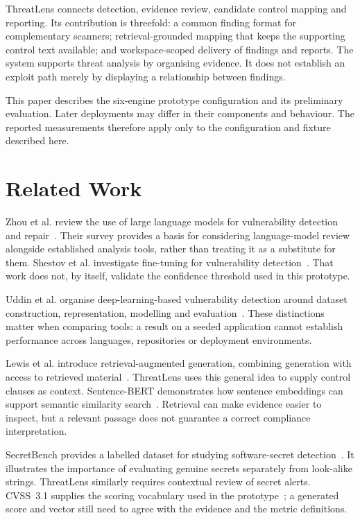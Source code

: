 \documentclass[conference,letterpaper]{IEEEtran}
\begin{document}
ThreatLens connects detection, evidence review, candidate control mapping and reporting. Its contribution is threefold: a common finding format for complementary scanners; retrieval-grounded mapping that keeps the supporting control text available; and workspace-scoped delivery of findings and reports. The system supports threat analysis by organising evidence. It does not establish an exploit path merely by displaying a relationship between findings.

This paper describes the six-engine prototype configuration and its preliminary evaluation. Later deployments may differ in their components and behaviour. The reported measurements therefore apply only to the configuration and fixture described here.

\section{Related Work}
Zhou et al. review the use of large language models for vulnerability detection and repair~\cite{zhou}. Their survey provides a basis for considering language-model review alongside established analysis tools, rather than treating it as a substitute for them. Shestov et al. investigate fine-tuning for vulnerability detection~\cite{shestov}. That work does not, by itself, validate the confidence threshold used in this prototype.

Uddin et al. organise deep-learning-based vulnerability detection around dataset construction, representation, modelling and evaluation~\cite{uddin}. These distinctions matter when comparing tools: a result on a seeded application cannot establish performance across languages, repositories or deployment environments.

Lewis et al. introduce retrieval-augmented generation, combining generation with access to retrieved material~\cite{lewis}. ThreatLens uses this general idea to supply control clauses as context. Sentence-BERT demonstrates how sentence embeddings can support semantic similarity search~\cite{sbert}. Retrieval can make evidence easier to inspect, but a relevant passage does not guarantee a correct compliance interpretation.

SecretBench provides a labelled dataset for studying software-secret detection~\cite{secretbench}. It illustrates the importance of evaluating genuine secrets separately from look-alike strings. ThreatLens similarly requires contextual review of secret alerts. CVSS~3.1 supplies the scoring vocabulary used in the prototype~\cite{cvss}; a generated score and vector still need to agree with the evidence and the metric definitions.
\end{document}
